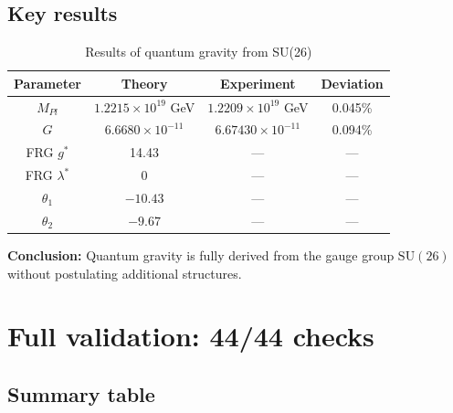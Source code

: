 \documentclass[12pt,a4paper,twoside]{article}
\newcommand{\SU}{\mathrm{SU}}
\theoremstyle{definition}
\begin{document}
\subsection{Key results}

\begin{table}[H]
\centering
\small
\caption{Results of quantum gravity from SU(26)}
\label{tab:quantum_gravity_results}
\begin{tabular}{c|c|c|c}
\toprule
\textbf{Parameter} & \textbf{Theory} & \textbf{Experiment} & \textbf{Deviation} \\
\midrule
$M_{Pl}$ & $1.2215 \times 10^{19}$ GeV & $1.2209 \times 10^{19}$ GeV & 0.045\% \\
$G$ & $6.6680 \times 10^{-11}$ & $6.67430 \times 10^{-11}$ & 0.094\% \\
FRG $g^*$ & 14.43 & — & — \\
FRG $\lambda^*$ & 0 & — & — \\
$\theta_1$ & $-10.43$ & — & — \\
$\theta_2$ & $-9.67$ & — & — \\
\bottomrule
\end{tabular}
\end{table}

\textbf{Conclusion:} Quantum gravity is fully derived from the gauge group $\SU(26)$ without postulating additional structures.

\section{Full validation: 44/44 checks}
\label{sec:validation}

\subsection{Summary table}
\end{document}
